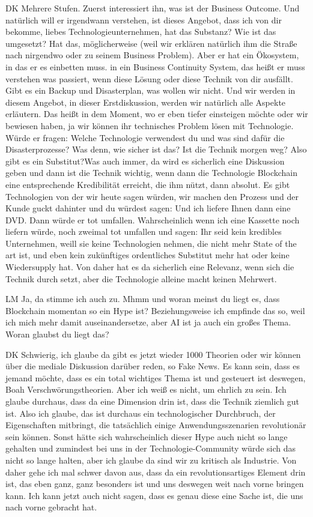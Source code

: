 \begin{xlist}
     \item[DK] Mehrere Stufen. Zuerst interessiert ihn, was ist der Business Outcome. Und natürlich will er irgendwann verstehen, ist dieses Angebot, dass ich von dir bekomme, liebes Technologieunternehmen,  hat das Substanz? Wie ist das umgesetzt? Hat das, möglicherweise (weil wir erklären natürlich ihm die Straße nach nirgendwo oder zu seinem Business Problem). Aber er hat ein Ökosystem, in das er es einbetten muss. in ein Business Continuity System, das heißt er muss verstehen was passiert, wenn diese Lösung oder diese Technik von dir ausfällt. Gibt es ein Backup und Disasterplan, was wollen wir nicht. Und wir werden in diesem Angebot, in dieser Erstdiskussion, werden wir natürlich alle Aspekte erläutern. Das heißt in dem Moment, wo er eben tiefer einsteigen möchte oder wir bewiesen haben, ja wir können ihr technisches Problem lösen mit Technologie. Würde er fragen: Welche Technologie verwendest du und was sind dafür die Disasterprozesse? Was denn, wie sicher ist das? Ist die Technik morgen weg? Also gibt es ein Substitut?Was auch immer,  da wird es sicherlich eine Diskussion geben und dann ist die Technik wichtig, wenn dann die Technologie Blockchain eine entsprechende Kredibilität erreicht, die ihm nützt, dann absolut. Es gibt Technologien von der wir heute sagen würden, wir machen den Prozess und der Kunde guckt dahinter und du würdest sagen: Und ich liefere Ihnen dann eine DVD. Dann würde er tot umfallen. Wahrscheinlich wenn ich eine Kassette noch liefern würde, noch zweimal tot umfallen und sagen: Ihr seid kein kredibles Unternehmen, weill sie keine Technologien nehmen, die nicht mehr State of the art ist, und eben kein zukünftiges ordentliches Substitut mehr hat oder keine Wiedersupply hat. Von daher hat es da sicherlich eine Relevanz, wenn sich die Technik durch setzt, aber die Technologie alleine macht keinen Mehrwert.
     \item[LM] Ja, da stimme ich auch zu. Mhmm und woran meinst du liegt es, dass Blockchain momentan so ein Hype ist? Beziehungsweise ich empfinde das so,  weil ich mich mehr damit auseinandersetze, aber AI ist ja auch ein großes Thema. Woran glaubst du liegt das?
     \item[DK] Schwierig, ich glaube da gibt es jetzt wieder 1000 Theorien oder wir können über die mediale Diskussion darüber reden,  so Fake News. Es kann sein, dass es jemand möchte, dass es ein total wichtiges Thema ist und gesteuert ist deswegen, Boah Verschwörungstheorien. Aber ich weiß es nicht, um ehrlich zu sein. Ich glaube durchaus, dass da eine Dimension drin ist, dass die Technik ziemlich gut ist.  Also ich glaube, das ist durchaus ein technologischer Durchbruch, der Eigenschaften mitbringt, die tatsächlich einige Anwendungsszenarien revolutionär sein können. Sonst hätte sich wahrscheinlich dieser Hype auch nicht so lange gehalten und zumindest bei uns in der Technologie-Community würde sich das nicht so lange halten, aber ich glaube da sind wir zu kritisch als Industrie. Von daher gehe ich mal schwer davon aus, dass da ein revolutionsartiges Element drin ist, das eben ganz, ganz besonders ist und uns deswegen weit nach vorne bringen kann. Ich kann jetzt auch nicht sagen, dass es genau diese eine Sache ist, die uns nach vorne gebracht hat. 

\end{xlist}
